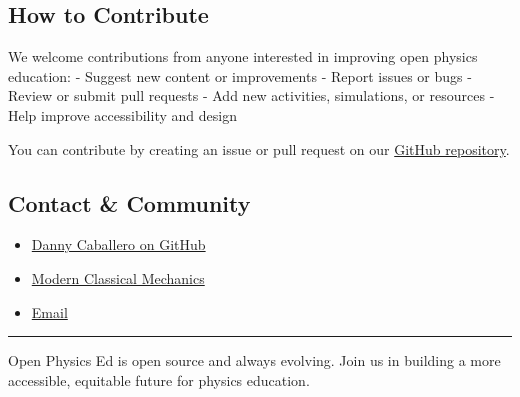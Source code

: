 \subsection{How to Contribute}\label{how-to-contribute}

We welcome contributions from anyone interested in improving open
physics education: - Suggest new content or improvements - Report issues
or bugs - Review or submit pull requests - Add new activities,
simulations, or resources - Help improve accessibility and design

You can contribute by creating an issue or pull request on our
\href{https://github.com/open-physics-ed/open-physics-ed-org.github.io}{GitHub
repository}.

\subsection{Contact \& Community}\label{contact-community}

\begin{itemize}
\tightlist
\item
  \href{https://github.com/dannycab}{Danny Caballero on GitHub}
\item
  \href{https://dannycaballero.info/modern-classical-mechanics/}{Modern
  Classical Mechanics}
\item
  \href{mailto:danny@hellmo.space}{Email}
\end{itemize}

\begin{center}\rule{0.5\linewidth}{0.5pt}\end{center}

Open Physics Ed is open source and always evolving. Join us in building
a more accessible, equitable future for physics education.
